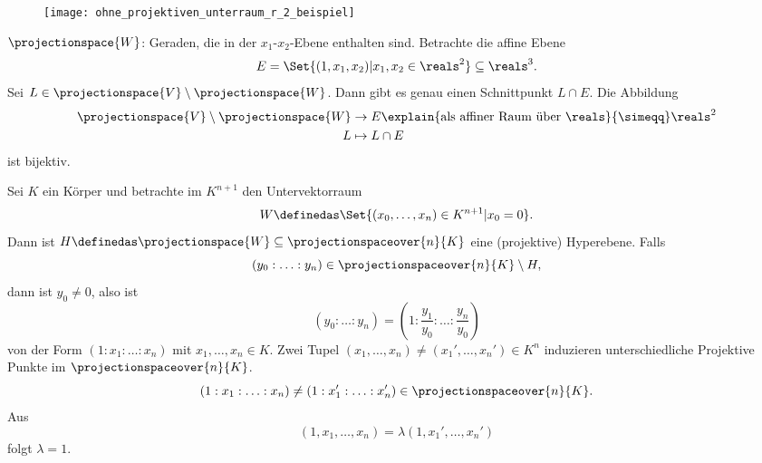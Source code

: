 \begin{figure}[H]
  \centering
  \texttt{[image: ohne\_projektiven\_unterraum\_r\_2\_beispiel]}
  \label{fig:ohne_projektiven_unterraum_r_2_beispiel}
\end{figure}
\( \projectionspace{W} \): Geraden, die in der \( x_1 \)-\( x_2 \)-Ebene enthalten sind. Betrachte die affine Ebene
\begin{equation*}
  E=\Set{(1,x_1,x_2)|x_1,x_2\in \reals^2}\subseteq \reals^3.
\end{equation*}
Sei \( L\in \projectionspace{V}\setminus \projectionspace{W} \). Dann gibt es genau einen Schnittpunkt \( L\cap E \). Die Abbildung
\begin{equation*}
  \begin{split}
    \projectionspace{V}\setminus\projectionspace{W}&\to E\explain{\text{als affiner Raum über \( \reals \)}}{\simeqq}\reals^2\\
    L&\mapsto L\cap E
  \end{split}
\end{equation*}
ist bijektiv.

 Sei \( K \) ein Körper und betrachte im \( K^{n+1} \) den Untervektorraum
\begin{equation*}
  W\definedas \Set{(x_0,\dotsc,x_n)\in K^{n+1}|x_0=0}.
\end{equation*}
Dann ist \( H\definedas \projectionspace{W}\subseteq \projectionspaceover{n}{K} \) eine (projektive) Hyperebene. Falls 
\begin{equation*}
  (y_0:\dotsc:y_n)\in \projectionspaceover{n}{K}\setminus H,
\end{equation*}
dann ist \( y_0\neq 0 \), also ist 
\begin{equation*}
  (y_0:\dotsc:y_n)=\left( 1:\frac{y_1}{y_0}:\dotsc:\frac{y_n}{y_0} \right)
\end{equation*}
von der Form \( (1:x_1:\dotsc:x_n) \) mit \( x_1,\dotsc,x_n \in K\). Zwei Tupel \( (x_1,\dotsc,x_n)\neq(x_1',\dotsc,x_n')\in K^n \) induzieren unterschiedliche Projektive Punkte im \( \projectionspaceover{n}{K} \).
\begin{equation*}
  (1:x_1:\dotsc:x_n)\neq (1:x_1':\dotsc:x_n')\in \projectionspaceover{n}{K}.
\end{equation*}
Aus
\begin{equation*}
  (1,x_1,\dotsc,x_n)=\lambda(1,x_1',\dotsc,x_n')
\end{equation*}
folgt \( \lambda=1 \).

